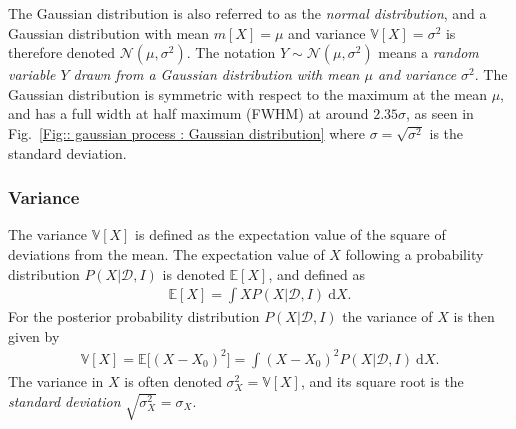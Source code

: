 \documentclass[twoside,english]{uiofysmaster}
\begin{document}
{{The Gaussian distribution is also referred to as the \textit{normal distribution}, and a Gaussian distribution with mean $m[X]= \mu$ and variance $\mathbb{V}[X]=\sigma^2$ is therefore denoted $\mathcal{N}(\mu, \sigma^2)$. The notation $Y \sim \mathcal{N}(\mu, \sigma^2)$ means a \textit{random variable $Y$ drawn from a Gaussian distribution with mean $\mu$ and variance $\sigma^2$}. The Gaussian distribution is symmetric with respect to the maximum at the mean $\mu$, and has a full width at half maximum (FWHM) at around $2.35 \sigma$, as seen in Fig.~\ref{Fig:: gaussian process : Gaussian distribution} where $\sigma = \sqrt{\sigma^2}$ is the standard deviation.  



\subsubsection{Variance}

The variance $\mathbb{V} [X]$ is defined as the expectation value of the square of deviations from the mean. The expectation value of $X$ following a probability distribution $P(X | \mathcal{D}, I)$ is denoted $\mathbb{E}[X]$, and defined as
\begin{align}
\mathbb{E}[X] = \int X P(X | \mathcal{D}, I) ~\text{d}X .
\end{align}
 For the posterior probability distribution $P(X| \mathcal{D}, I)$ the variance of $X$ is then given by \cite{sivia2006data}
\begin{align}\label{Eq:: gaussian process : variance X 1dim}
\mathbb{V}[X] = \mathbb{E} \big[ (X - X_0)^2 \big] = \int  (X - X_0)^2 P (X| \mathcal{D}, I) ~\text{d}X.
\end{align}
The variance in $X$ is often denoted $\sigma_X^2 = \mathbb{V}[X]$, and its square root is the \textit{standard deviation} $\sqrt{\sigma^2_X} = \sigma_X$. 

}}
\end{document}
